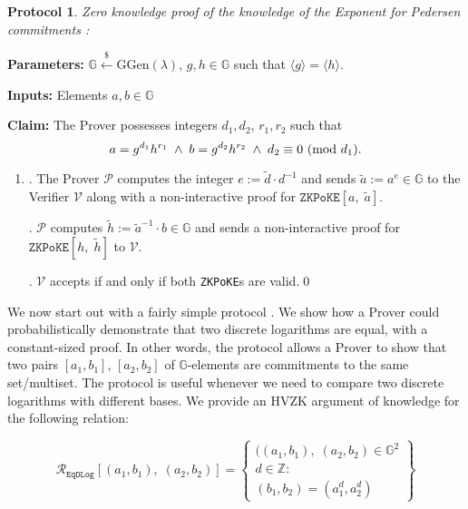 \documentclass[11pt, lettersize, notitlepage, leqno, footskip=0.6cm]{article}
\newcommand{\ttt}{\texttt}
\newcommand{\bG}{\mathbb{G}}
\newcommand{\la}{\langle}
\newcommand{\ra}{\rangle}
\newcommand{\wti}{\widetilde}
\newcommand{\mc}{\mathcal}
\newcommand{\mb}{\mathbb}
\newcommand{\mr}{\mathrm}
\newcommand{\lamb}{\lambda}
\newcommand{\mP}{\mc{P}}
\newcommand{\V}{\mc{V}}
\newcommand{\vs}{\vspace{-0.15cm}}
\newcommand{\noin}{\noindent}
\newcommand{\Mod}[1]{\ (\mathrm{mod}\ #1)}
\newtheorem{Prot}[Thm]{Protocol}
\numberwithin{equation}{section}
\begin{document}
\begin{Prot} \normalfont \hypertarget{ZKPoKEPed}{\textit{Zero knowledge proof of the knowledge of the Exponent for Pedersen commitments}} :\end{Prot} \vspace{-0.3cm}

\noin \textbf{Parameters:} $\mb{G}\xleftarrow{\$} \mr{GGen}(\lamb)$,  $g,h\in \mb{G}$ such that $\la g \ra = \la h \ra$.

\noin \textbf{Inputs:} Elements $a,b\in\bG$

\noin \textbf{Claim:} The Prover possesses integers $d_1,d_2$, $r_1,r_2$ such that \vs $$a = g^{d_1}h^{r_1} \;\wedge\; b = g^{d_2}h^{r_2} \;\wedge\; d_2\equiv 0\Mod{d_1} . \vs $$

\begin{enumerate}[wide, labelwidth=!, labelindent=0pt]\vs \item


\noin 1. The Prover $\mP$ computes the integer $e:= \wti{d}\cdot{d}^{-1}$ and sends $\wti{a}:= a^{e}\in \bG$ to the Verifier $\V$ along with a non-interactive proof for $\ttt{ZKPoKE}[a,\;\wti{a}]$.

\noin 2. $\mP$ computes $\wti{h}:= \wti{a}^{-1}\cdot b\in \bG$ and sends a non-interactive proof for $\ttt{ZKPoKE}[h,\;\wti{h}]$ to $\V$.

\noin 3. $\V$ accepts if and only if both \verb|ZKPoKE|s are valid.\qed \end{enumerate}


  

We now start out with a fairly simple protocol . We show how a Prover could probabilistically demonstrate that two discrete logarithms are equal, with a constant-sized proof. In other words, the protocol allows a Prover to show that two pairs $[a_1, b_1]$, $[a_2, b_2]$ of $\bG$-elements are commitments to the same set/multiset. The protocol is useful whenever we need to compare two discrete logarithms with different bases. We provide an HVZK argument of knowledge for  the following relation:\vs

\[
  \mc{R}_{\ttt{EqDLog}}[(a_1, b_1),\;(a_2,b_2)] = \left\{\begin{array}{l}
    ((a_1, b_1),\; (a_2,b_2)\in\mb{G}^2\\
    d\in\mb{Z}: \\
    (b_1,b_2) = (a_1^d,a_2^d)
  \end{array}\right\}
\] \vspace{0.1cm}
\end{document}
